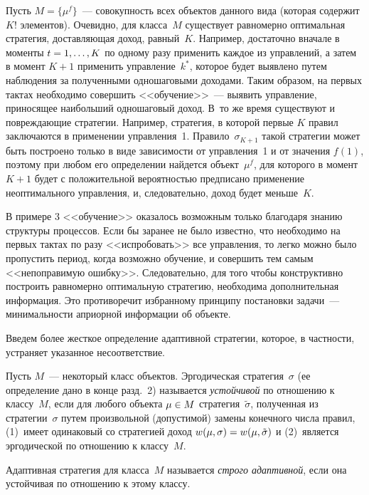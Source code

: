 \begin{multicols}{2}
  Пусть $M=\{\mu^f\}$~--- совокупность всех объектов данного вида (которая содержит 
$K!$ элементов). Очевидно, для класса~$M$ существует равномерно оптимальная 
стратегия, доставляющая доход, равный~$K$. Например, достаточно вначале в моменты 
$t\hm=1, \ldots , K$ по одному разу применить каждое из управлений, а затем в момент 
$K+1$ применить управление~$k^*$, которое будет выявлено путем наблюдения за 
полученными одношаговыми доходами. Таким образом, на первых тактах необходимо совершить 
<<обучение>>~--- выявить управление, приносящее наибольший одношаговый доход. 
В~то же время существуют и повреждающие стратегии. Например, стратегия, в которой 
первые $K$ правил заключаются в применении управления~1. Правило~$\sigma_{K+1}$ 
такой стратегии может быть построено только в виде зависимости от управления~1 и от 
значения $f(1)$, поэтому при любом его определении найдется объект~$\mu^f$, для 
которого в момент $K+1$ будет с положительной вероятностью предписано применение 
неоптимального управления, и, следовательно, доход будет меньше~$K$.
  
  В примере 3 <<обучение>> оказалось возможным только благодаря знанию структуры 
процессов. Если бы заранее не было известно, что необходимо на первых тактах по разу 
<<испробовать>> все управ\-ле\-ния, то легко можно было пропустить период, когда 
возможно обучение, и совершить тем самым <<непоправимую ошибку>>. Следовательно, 
для того чтобы конструктивно построить равномерно оптимальную стратегию, 
необходима дополнительная информация. Это противоречит избранному принципу 
постановки задачи~--- минимальности априорной информации об объекте. 

Введем более 
жесткое определение адаптивной стратегии, которое, в част\-ности, устраняет указанное 
несоответствие.
  
  Пусть $M$~--- некоторый класс объектов. Эргодическая стратегия~$\sigma$ (ее 
определение дано в конце разд.~2) называется \textit{устойчивой} по отношению к 
классу~$M$, если для любого объекта $\mu\hm\in M$ стратегия~$\tilde{\sigma}$, 
полученная из стратегии~$\sigma$ путем произвольной (допустимой) замены конечного 
числа правил, (1)~имеет одинаковый со стратегией доход 
$w(\mu,\sigma)\hm=w(\mu,\tilde{\sigma})$ и (2)~является эргодической по отношению к 
классу~$M$.

  
  Адаптивная стратегия для класса~$M$ называется \textit{строго адаптивной}, если она 
устойчивая по отношению к этому классу.
  
  \medskip
  

\end{multicols}
